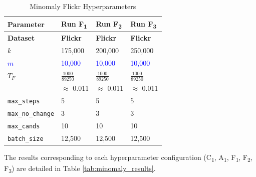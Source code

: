 \documentclass[preprint,12pt]{elsarticle}
\newcommand{\new}[1]{\textcolor{blue}{#1}}
\theoremstyle{plain}
\theoremstyle{definition}
\theoremstyle{remark}
\begin{document}
\begin{table}[htbp]
\centering
\caption{Minomaly Flickr Hyperparameters}
\scriptsize
\label{tab:flickr_minomaly_hyperparameters}
\begin{tabular}{|l|l|l|l|}
\hline
\textbf{Parameter} & \textbf{Run F\textsubscript{1}} & \textbf{Run F\textsubscript{2}} & \textbf{Run F\textsubscript{3}} \\ \hline
\textbf{Dataset}   & \textbf{Flickr}         & \textbf{Flickr}         & \textbf{Flickr}         \\ \hline
\boldmath$k$       & 175,000        & 200,000        & 250,000        \\ \hline
\new{\boldmath$m$}       & \new{10,000}        & \new{10,000}        & \new{10,000}        \\ \hline
\boldmath$T_F$     & $\frac{1000}{89250}$ & $\frac{1000}{89250}$ & $\frac{1000}{89250}$ \\
                   & $\approx$ 0.011  & $\approx$ 0.011  & $\approx$ 0.011 \\ \hline
\texttt{max\_steps} & 5              & 5              & 5              \\ \hline
\texttt{max\_no\_change} & 3              & 3              & 3              \\ \hline
\texttt{max\_cands} & 10             & 10             & 10             \\ \hline
\texttt{batch\_size} & 12,500         & 12,500         & 12,500         \\ \hline
\end{tabular}
\end{table}

The results corresponding to each hyperparameter configuration (C\textsubscript{1}, A\textsubscript{1}, F\textsubscript{1}, F\textsubscript{2}, F\textsubscript{3}) are detailed in Table \ref{tab:minomaly_results}.
\end{document}
